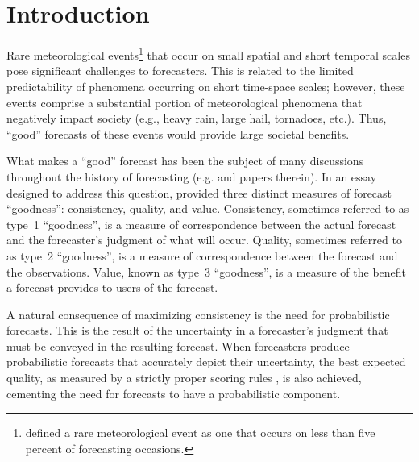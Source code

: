 

\chapter{Introduction}
\label{intro}

Rare meteorological events\footnote{\cite{Murphy1991} defined a rare meteorological event as one that occurs on less than five percent of forecasting occasions.} that occur on small spatial and short temporal scales pose significant challenges to forecasters.
This is related to the limited predictability of phenomena occurring on short time-space scales; however, these events comprise a substantial portion of meteorological phenomena that negatively impact society (e.g., heavy rain, large hail, tornadoes, etc.).
Thus, ``good'' forecasts of these events would provide large societal benefits.


What makes a ``good'' forecast has been the subject of many discussions throughout the history of forecasting (e.g. \citealp{Peirce1884, Clayton1889, Nichols1890, Mascart1922, Winkler1968, Murphy1993, Murphy1996} and papers therein).
In an essay designed to address this question, \cite{Murphy1993} provided three distinct measures of forecast ``goodness'': consistency, quality, and value.
Consistency, sometimes referred to as \mbox{type 1} ``goodness'', is a measure of correspondence between the actual forecast and the forecaster's judgment of what will occur.
Quality, sometimes referred to as \mbox{type 2} ``goodness'', is a measure of correspondence between the forecast and the observations.
Value, known as \mbox{type 3} ``goodness'', is a measure of the benefit a forecast provides to users of the forecast.


A natural consequence of maximizing consistency is the need for probabilistic forecasts.
This is the result of the uncertainty in a forecaster's judgment that must be conveyed in the resulting forecast.
When forecasters produce probabilistic forecasts that accurately depict their uncertainty, the best expected quality, as measured by a strictly proper scoring rules \citep{Winkler1968}, is also achieved, cementing the need for forecasts to have a probabilistic component.


